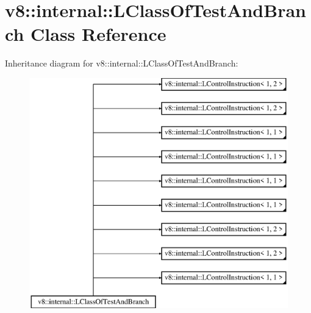 \hypertarget{classv8_1_1internal_1_1_l_class_of_test_and_branch}{}\section{v8\+:\+:internal\+:\+:L\+Class\+Of\+Test\+And\+Branch Class Reference}
\label{classv8_1_1internal_1_1_l_class_of_test_and_branch}
Inheritance diagram for v8\+:\+:internal\+:\+:L\+Class\+Of\+Test\+And\+Branch\+:\begin{figure}[H]
\begin{center}
\leavevmode
\includegraphics[height=10.000000cm]{classv8_1_1internal_1_1_l_class_of_test_and_branch}
\end{center}
\end{figure}

